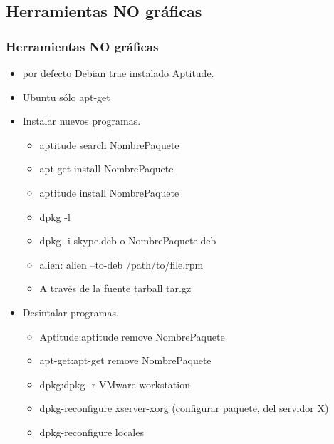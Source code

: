 \documentclass{beamer}
\begin{document}
\subsection{Herramientas NO gr\'aficas}
\begin{frame}
\frametitle{Herramientas NO gr\'aficas}
	\begin{itemize}
	\item por defecto Debian trae instalado Aptitude.
	\item Ubuntu s\'olo apt-get
	\item Instalar nuevos programas.
		\begin{itemize}
			\item \alert{aptitude search  NombrePaquete}
			\item \alert{apt-get install NombrePaquete}
			\item \alert{aptitude install NombrePaquete}
			\item  dpkg -l
			\item  dpkg -i skype.deb o NombrePaquete.deb
			\item \alert {alien:} alien --to-deb /path/to/file.rpm
			\item A trav\'es de la fuente tarball tar.gz
		\end{itemize}
	\item Desintalar programas.
		\begin{itemize}
			\item \alert{Aptitude:}aptitude remove NombrePaquete
			\item \alert{apt-get:}apt-get remove NombrePaquete
			\item \alert{dpkg:}dpkg -r VMware-workstation 
			\item dpkg-reconfigure  xserver-xorg (configurar paquete, del servidor X)
			\item dpkg-reconfigure  locales
		\end{itemize}
	\end{itemize}
\end{frame} 
\end{document}
